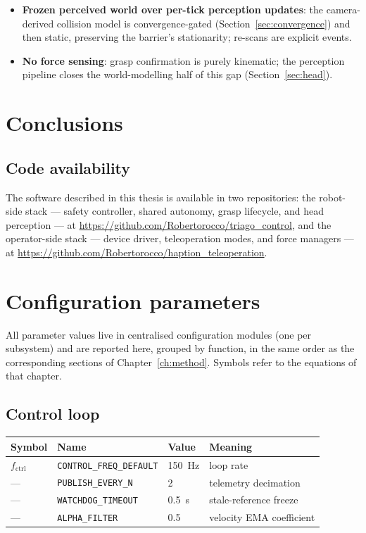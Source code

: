 \documentclass[12pt,a4paper,twoside,openright]{report}
\begin{document}
\begin{itemize}[nosep]
\item \textbf{Frozen perceived world over per-tick perception updates}: the camera-derived collision model is convergence-gated (Section~\ref{sec:convergence}) and then static, preserving the barrier's stationarity; re-scans are explicit events.
\item \textbf{No force sensing}: grasp confirmation is purely kinematic; the perception pipeline closes the world-modelling half of this gap (Section~\ref{sec:head}).
\end{itemize}

\chapter{Conclusions}
\label{ch:conclusions}

\section*{Code availability}
The software described in this thesis is available in two repositories: the robot-side stack --- safety controller, shared autonomy, grasp lifecycle, and head perception --- at \url{https://github.com/Robertorocco/triago_control}, and the operator-side stack --- device driver, teleoperation modes, and force managers --- at \url{https://github.com/Robertorocco/haption_teleoperation}.


\appendix
\chapter{Configuration parameters}
\label{app:config}


All parameter values live in centralised configuration modules (one per subsystem) and are reported here, grouped by function, in the same order as the corresponding sections of Chapter~\ref{ch:method}. Symbols refer to the equations of that chapter.

\begingroup\footnotesize

\section{Control loop}
\begin{tabularx}{\linewidth}{@{}lllX@{}}
\toprule
Symbol & Name & Value & Meaning \\
\midrule
$f_{\text{ctrl}}$ & \texttt{CONTROL\_FREQ\_DEFAULT} & 150~Hz & loop rate \\
--- & \texttt{PUBLISH\_EVERY\_N} & 2 & telemetry decimation \\
--- & \texttt{WATCHDOG\_TIMEOUT} & 0.5~s & stale-reference freeze \\
--- & \texttt{ALPHA\_FILTER} & 0.5 & velocity EMA coefficient \\
\bottomrule
\end{tabularx}
\end{document}
